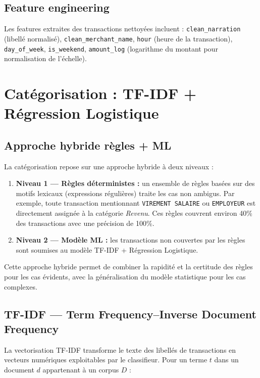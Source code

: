 \documentclass[12pt,a4paper]{report}
\begin{document}
\subsection{Feature engineering}

Les features extraites des transactions nettoyées incluent :
\texttt{clean\_narration} (libellé normalisé), \texttt{clean\_merchant\_name},
\texttt{hour} (heure de la transaction), \texttt{day\_of\_week},
\texttt{is\_weekend}, \texttt{amount\_log} (logarithme du montant pour
normalisation de l'échelle).

\section{Catégorisation : TF-IDF + Régression Logistique}

\subsection{Approche hybride règles + ML}

La catégorisation repose sur une approche hybride à deux niveaux :

\begin{enumerate}
  \item \textbf{Niveau 1 — Règles déterministes :} un ensemble de règles
    basées sur des motifs lexicaux (expressions régulières) traite les cas
    non ambigus. Par exemple, toute transaction mentionnant \texttt{VIREMENT SALAIRE}
    ou \texttt{EMPLOYEUR} est directement assignée à la catégorie \emph{Revenu}.
    Ces règles couvrent environ 40\% des transactions avec une précision de 100\%.

  \item \textbf{Niveau 2 — Modèle ML :} les transactions non couvertes par les
    règles sont soumises au modèle TF-IDF + Régression Logistique.
\end{enumerate}

Cette approche hybride permet de combiner la rapidité et la certitude des règles
pour les cas évidents, avec la généralisation du modèle statistique pour les
cas complexes.

\subsection{TF-IDF — Term Frequency–Inverse Document Frequency}

La vectorisation TF-IDF transforme le texte des libellés de transactions en
vecteurs numériques exploitables par le classifieur. Pour un terme \(t\)
dans un document \(d\) appartenant à un corpus \(D\) :
\end{document}
